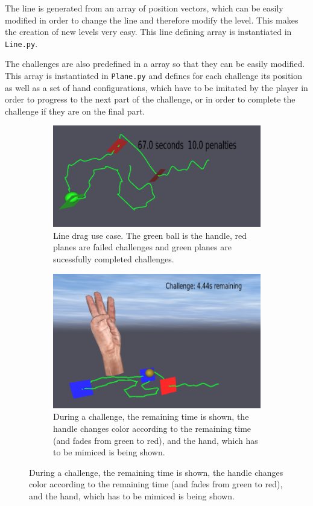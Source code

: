 The line is generated from an array of position vectors, which can be easily modified in order to change the line and therefore modify the level. This makes the creation of new levels very easy. This line defining array is instantiated in \texttt{Line.py}.

The challenges are also predefined in a array so that they can be easily modified. This array is instantiated in \texttt{Plane.py} and defines for each challenge its position as well as a set of hand configurations, which have to be imitated by the player in order to progress to the next part of the challenge, or in order to complete the challenge if they are on the final part.

\begin{figure}
	\begin{subfigure}{\textwidth}
		\centering
		\includegraphics[width=.75\linewidth]{./images/successfulchallenge.png}
		\caption{Line drag use case. The green ball is the handle, red planes are failed challenges and green planes are sucessfully completed challenges.}
	\end{subfigure}
	\begin{subfigure}{\textwidth}
		\centering
		\includegraphics[width=.75\linewidth]{./images/challenge2.png}
		\caption{During a challenge, the remaining time is shown, the handle changes color according to the remaining time (and fades from green to red), and the hand, which has to be mimiced is being shown.}

\end{subfigure}
\end{figure}
